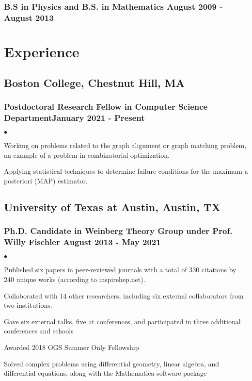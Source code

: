 \documentclass[letterpaper]{article}
\renewenvironment{itemize}{
  \begin{list}{$\bullet$}{
    \setlength{\itemsep}{0em}
    \setlength{\parskip}{0em}
    \setlength{\parsep}{0em} 
    \setlength{\topsep}{0em} 
  }
}{
  \end{list}
}
\begin{document}
\subsubsection*{B.S in Physics and B.S. in Mathematics \hfill August 2009 - August 2013}

\section*{Experience}

\subsection*{Boston College, Chestnut Hill, MA} 
\subsubsection*{Postdoctoral Research Fellow in Computer Science Department\hfill January 2021 - Present}
    \begin{itemize}
        
        \item Working on problems related to the graph alignment or graph matching problem, an example of a problem in combinatorial optimization.
        
        \item Applying statistical techniques to determine failure conditions for the maximum a posteriori (MAP)  estimator.
        
    \end{itemize}

\subsection*{University of Texas at Austin, Austin, TX} 
\subsubsection*{Ph.D. Candidate in Weinberg Theory Group under Prof. Willy Fischler \hfill August 2013 - May 2021}
    \begin{itemize}

        \item Published six papers in peer-reviewed journals with a total of 330 citations by 240 unique works (according to inspirehep.net). 
        \item Collaborated with 14 other researchers, including six external collaborators from two institutions.
        \item Gave six external talks, five at conferences, and participated in three additional conferences and schools
        \item Awarded 2018 OGS Summer Only Fellowship
        \item Solved complex problems using differential geometry, linear algebra, and differential equations, along with the Mathematica software package
        
    \end{itemize}
    
\end{document}
